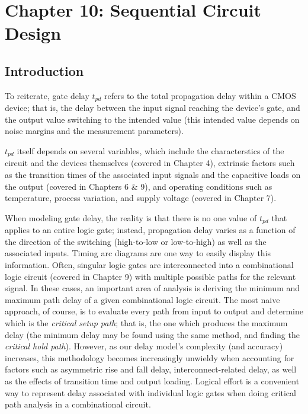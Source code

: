 \documentclass{article}
\begin{document}
\setcounter{section}{9}
\section{Chapter 10: Sequential Circuit Design} 
\setcounter{subsection}{0}
\subsection{Introduction}

To reiterate, gate delay \(t_{pd}\) refers to the total propagation delay within a CMOS device; that is, the delay between the input signal reaching the device's gate, and the output value switching to the intended value (this intended value depends on noise margins and the measurement parameters).

\(t_{pd}\) itself depends on several variables, which include the characterstics of the circuit and the devices themselves (covered in Chapter 4), extrinsic factors such as the transition times of the associated input signals and the capacitive loads on the output (covered in Chapters 6 \& 9), and operating conditions such as temperature, process variation, and supply voltage (covered in Chapter 7).

When modeling gate delay, the reality is that there is no one value of \(t_{pd}\) that applies to an entire logic gate; instead, propagation delay varies as a function of the direction of the switching (high-to-low or low-to-high) as well as the associated inputs. Timing arc diagrams are one way to easily display this information. Often, singular logic gates are interconnected into a combinational logic circuit (covered in Chapter 9) with multiple possible paths for the relevant signal. In these cases, an important area of analysis is deriving the minimum and maximum path delay of a given combinational logic circuit. The most naive approach, of course, is to evaluate every path from input to output and determine which is the \textit{critical setup path}; that is, the one which produces the maximum delay (the minimum delay may be found using the same method, and finding the \textit{critical hold path}). However, as our delay model's complexity (and accuracy) increases, this methodology becomes increasingly unwieldy when accounting for factors such as asymmetric rise and fall delay, interconnect-related delay, as well as the effects of transition time and output loading. Logical effort is a convenient way to represent delay associated with individual logic gates when doing critical path analysis in a combinational circuit.
\end{document}
